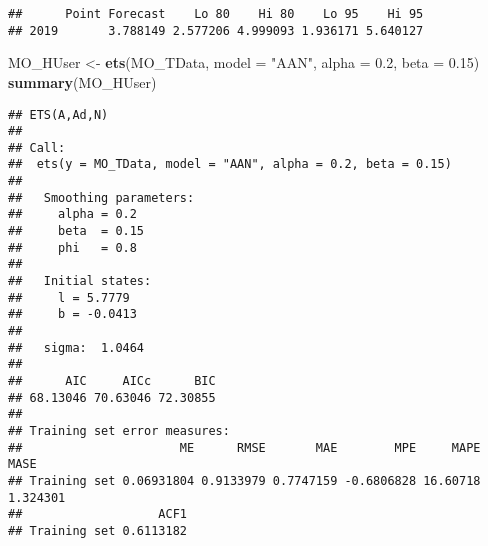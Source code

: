 \documentclass[
]{article}
\newenvironment{Shaded}{\begin{snugshade}}{\end{snugshade}}
\newcommand{\CommentTok}[1]{\textcolor[rgb]{0.56,0.35,0.01}{\textit{#1}}}
\newcommand{\DataTypeTok}[1]{\textcolor[rgb]{0.13,0.29,0.53}{#1}}
\newcommand{\DecValTok}[1]{\textcolor[rgb]{0.00,0.00,0.81}{#1}}
\newcommand{\FloatTok}[1]{\textcolor[rgb]{0.00,0.00,0.81}{#1}}
\newcommand{\KeywordTok}[1]{\textcolor[rgb]{0.13,0.29,0.53}{\textbf{#1}}}
\newcommand{\NormalTok}[1]{#1}
\newcommand{\OperatorTok}[1]{\textcolor[rgb]{0.81,0.36,0.00}{\textbf{#1}}}
\newcommand{\StringTok}[1]{\textcolor[rgb]{0.31,0.60,0.02}{#1}}
\begin{document}
\begin{verbatim}
##      Point Forecast    Lo 80    Hi 80    Lo 95    Hi 95
## 2019       3.788149 2.577206 4.999093 1.936171 5.640127
\end{verbatim}

\begin{Shaded}
\end{Shaded}

\begin{Shaded}
\begin{Highlighting}[]
\NormalTok{MO_HUser <-}\StringTok{ }\KeywordTok{ets}\NormalTok{(MO_TData, }\DataTypeTok{model =} \StringTok{"AAN"}\NormalTok{, }\DataTypeTok{alpha =} \FloatTok{0.2}\NormalTok{, }\DataTypeTok{beta =} \FloatTok{0.15}\NormalTok{)}
\KeywordTok{summary}\NormalTok{(MO_HUser)}
\end{Highlighting}
\end{Shaded}

\begin{verbatim}
## ETS(A,Ad,N) 
## 
## Call:
##  ets(y = MO_TData, model = "AAN", alpha = 0.2, beta = 0.15) 
## 
##   Smoothing parameters:
##     alpha = 0.2 
##     beta  = 0.15 
##     phi   = 0.8 
## 
##   Initial states:
##     l = 5.7779 
##     b = -0.0413 
## 
##   sigma:  1.0464
## 
##      AIC     AICc      BIC 
## 68.13046 70.63046 72.30855 
## 
## Training set error measures:
##                      ME      RMSE       MAE        MPE     MAPE     MASE
## Training set 0.06931804 0.9133979 0.7747159 -0.6806828 16.60718 1.324301
##                   ACF1
## Training set 0.6113182
\end{verbatim}
\end{document}
